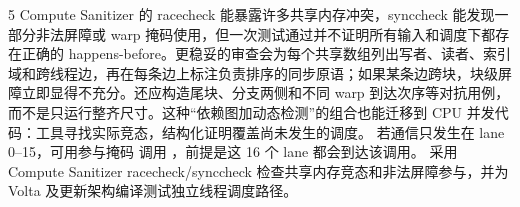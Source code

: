 \begin{solutionexercise}{5}
Compute Sanitizer 的 racecheck 能暴露许多共享内存冲突，synccheck 能发现一部分非法屏障或 warp 掩码使用，但一次测试通过并不证明所有输入和调度下都存在正确的 happens-before。更稳妥的审查会为每个共享数组列出写者、读者、索引域和跨线程边，再在每条边上标注负责排序的同步原语；如果某条边跨块，块级屏障立即显得不充分。还应构造尾块、分支两侧和不同 warp 到达次序等对抗用例，而不是只运行整齐尺寸。这种“依赖图加动态检测”的组合也能迁移到 CPU 并发代码：工具寻找实际竞态，结构化证明覆盖尚未发生的调度。
\variantheading 若通信只发生在 lane 0--15，可用参与掩码  调用 ，前提是这 16 个 lane 都会到达该调用。
\practiceheading 采用 Compute Sanitizer racecheck/synccheck 检查共享内存竞态和非法屏障参与，并为 Volta 及更新架构编译测试独立线程调度路径。
\end{solutionexercise}

